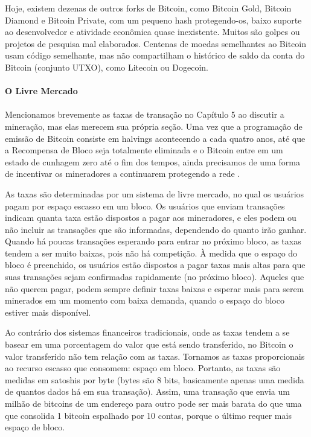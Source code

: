 Hoje, existem dezenas de outros forks de Bitcoin, como Bitcoin Gold, Bitcoin Diamond e Bitcoin Private, com um pequeno hash protegendo-os, baixo suporte ao desenvolvedor e atividade econômica quase inexistente. Muitos são golpes ou projetos de pesquisa mal elaborados. Centenas de moedas semelhantes ao Bitcoin usam código semelhante, mas não compartilham o histórico de saldo da conta do Bitcoin (conjunto UTXO), como Litecoin ou Dogecoin.

\paragraph{O Livre Mercado}
\paragraph{}

Mencionamos brevemente as taxas de transação no Capítulo 5 ao discutir a mineração, mas elas merecem sua própria seção. Uma vez que a programação de emissão de Bitcoin consiste em halvings acontecendo a cada quatro anos, até que a Recompensa de Bloco seja totalmente eliminada e o Bitcoin entre em um estado de cunhagem zero até o fim dos tempos, ainda precisamos de uma forma de incentivar os mineradores a continuarem protegendo a rede .

As taxas são determinadas por um sistema de livre mercado, no qual os usuários pagam por espaço escasso em um bloco. Os usuários que enviam transações indicam quanta taxa estão dispostos a pagar aos mineradores, e eles podem ou não incluir as transações que são informadas, dependendo do quanto irão ganhar. Quando há poucas transações esperando para entrar no próximo bloco, as taxas tendem a ser muito baixas, pois não há competição. À medida que o espaço do bloco é preenchido, os usuários estão dispostos a pagar taxas mais altas para que suas transações sejam confirmadas rapidamente (no próximo bloco). Aqueles que não querem pagar, podem sempre definir taxas baixas e esperar mais para serem minerados em um momento com baixa demanda, quando o espaço do bloco estiver mais disponível.

Ao contrário dos sistemas financeiros tradicionais, onde as taxas tendem a se basear em uma porcentagem do valor que está sendo transferido, no Bitcoin o valor transferido não tem relação com as taxas. Tornamos as taxas proporcionais ao recurso escasso que consomem: espaço em bloco. Portanto, as taxas são medidas em satoshis por byte (bytes são 8 bits, basicamente apenas uma medida de quantos dados há em sua transação). Assim, uma transação que envia um milhão de bitcoins de um endereço para outro pode ser mais barata do que uma que consolida 1 bitcoin espalhado por 10 contas, porque o último requer mais espaço de bloco.

